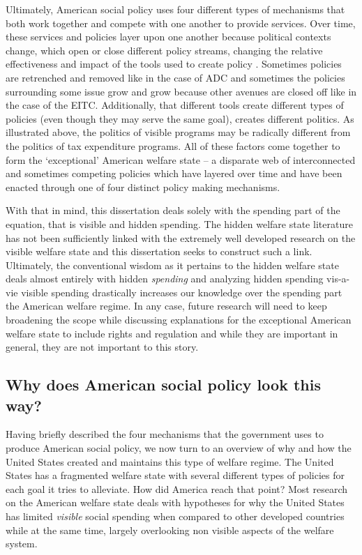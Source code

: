 \documentclass[12pt]{article}
\begin{document}
Ultimately, American social policy uses four different types of mechanisms that both work together and compete with one another to provide services. Over time, these services and policies layer upon one another because political contexts change, which open or close different policy streams, changing the relative effectiveness and impact of the tools used to create policy \citep{kingdon2011}. Sometimes policies are retrenched and removed like in the case of ADC and sometimes the policies surrounding some issue grow and grow because other avenues are closed off like in the case of the EITC. Additionally, that different tools create different types of policies (even though they may serve the same goal), creates different politics. As illustrated above, the politics of visible programs may be radically different from the politics of tax expenditure programs. All of these factors come together to form the `exceptional' American welfare state -- a disparate web of interconnected and sometimes competing policies which have layered over time and have been enacted through one of four distinct policy making mechanisms.

With that in mind, this dissertation deals solely with the spending part of the equation, that is visible and hidden spending. The hidden welfare state literature has not been sufficiently linked with the extremely well developed research on the visible welfare state and this dissertation seeks to construct such a link. Ultimately, the conventional wisdom as it pertains to the hidden welfare state deals almost entirely with hidden \emph{spending} and analyzing hidden spending vis-a-vie visible spending drastically increases our knowledge over the spending part the American welfare regime. In any case, future research will need to keep broadening the scope while discussing explanations for the exceptional American welfare state to include rights and regulation and while they are important in general, they are not important to this story.

\subsection{Why does American social policy look this way?}
Having briefly described the four mechanisms that the government uses to produce American social policy, we now turn to an overview of why and how the United States created and maintains this type of welfare regime. The United States has a fragmented welfare state with several different types of policies for each goal it tries to alleviate. How did America reach that point? Most research on the American welfare state deals with hypotheses for why the United States has limited \emph{visible} social spending when compared to other developed countries while at the same time, largely overlooking non visible aspects of the welfare system. 
\end{document}
